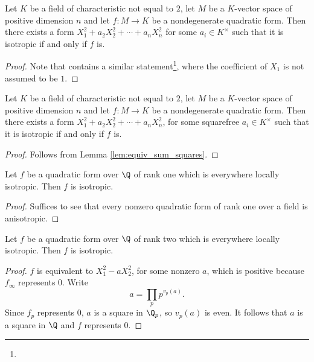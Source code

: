 \begin{lemma}\label{lem:equiv_sum_squares}
\leanok
Let $K$ be a field of characteristic not equal to $2$, let $M$ be a $K$-vector space of positive dimension $n$ and let $f : M \to K$ be a
nondegenerate quadratic form. Then there exists a form $X_1^2 +  a_2X_2^2 + \cdots + a_nX_n^2$ for some $a_i \in K^\times$ such that it is isotropic if and only if $f$ is.
\end{lemma}
\begin{proof}
\leanok
Note that \mathlib contains a similar statement\footnote{}, where the coefficient of $X_1$ is not assumed to be $1$.
\end{proof}

\begin{lemma}\label{lem:equiv_sum_squares_sqfree}
	\leanok
	Let $K$ be a field of characteristic not equal to $2$, let $M$ be a $K$-vector space of positive dimension $n$ and let $f : M \to K$ be a
	nondegenerate quadratic form. Then there exists a form $X_1^2 +  a_2X_2^2 + \cdots + a_nX_n^2$, for some squarefree $a_i \in K^\times$ such that it is isotropic if and only if $f$ is.
\end{lemma}
\begin{proof}
\leanok
Follows from Lemma \ref{lem:equiv_sum_squares}.
\end{proof}

\begin{lemma}\label{lem:isotr_of_rk_one}
	\leanok
	Let $f$ be a quadratic form over $\Q$ of rank one which is everywhere locally isotropic. Then $f$ is isotropic.
\end{lemma}
\begin{proof}
\leanok
Suffices to see that every nonzero quadratic form of rank one over a field is anisotropic.
\end{proof}

\begin{lemma}\label{lem:isotr_of_rk_two}
	\leanok
	Let $f$ be a quadratic form over $\Q$ of rank two which is everywhere locally isotropic. Then $f$ is isotropic.
\end{lemma}
\begin{proof}
\leanok
$f$ is equivalent to $X_1^2 - aX_2^2$, for some nonzero $a$, which is positive because $f_\infty$ represents $0$. Write
\[ a = \prod_p p^{v_p(a)}.\]
Since $f_p$ represents $0$, $a$ is a square in $\Q_p$, so $v_p(a)$ is even. It follows that $a$ is a square in $\Q$ and $f$ represents $0$.
\end{proof}

